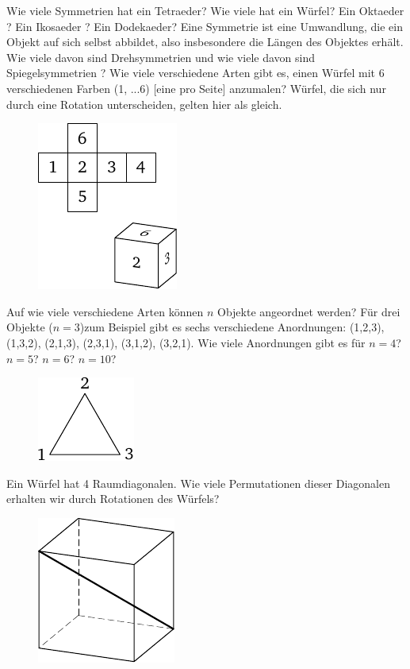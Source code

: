 \documentclass[12pt]{article} %
\begin{document}
 Wie viele Symmetrien hat ein Tetraeder? Wie viele hat ein Würfel? Ein Oktaeder ? Ein Ikosaeder ? Ein Dodekaeder? Eine Symmetrie ist eine Umwandlung, die ein Objekt auf sich selbst abbildet, also insbesondere die Längen des Objektes erhält. 
Wie viele davon sind Drehsymmetrien und wie viele davon sind Spiegelsymmetrien ?
\bigskip
\newline\newline\quad
{} Wie viele verschiedene Arten gibt es, einen Würfel mit 6 verschiedenen Farben (1, ...6) [eine pro Seite] anzumalen? Würfel, die sich nur durch eine Rotation unterscheiden, gelten hier als gleich.
\begin{figure}[h]
\centering
\includegraphics{taskbook-17}
\end{figure}

 Auf wie viele verschiedene Arten können $n$ Objekte angeordnet werden? 
Für drei Objekte ($n=3$)zum Beispiel gibt es sechs verschiedene Anordnungen: (1,2,3), (1,3,2), (2,1,3), (2,3,1), (3,1,2), (3,2,1). 
Wie viele Anordnungen gibt es für $n=4$? $n=5$? $n=6$? $n=10$?
\begin{figure}[h]
\centering
\includegraphics{taskbook-18}
\end{figure}

 Ein Würfel hat 4 Raumdiagonalen. Wie viele Permutationen dieser Diagonalen erhalten wir durch Rotationen des Würfels?
\begin{figure}[h]
\centering
\includegraphics{taskbook-19}
\end{figure}
\end{document}
